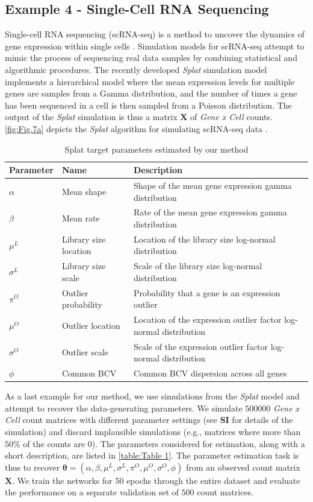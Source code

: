 \documentclass[9pt,twoside,lineno]{pnas-new}
\begin{document}
\subsection*{Example 4 - Single-Cell RNA Sequencing}
Single-cell RNA sequencing (scRNA-seq) is a method to uncover the dynamics of gene expression within single cells \cite{zappia2017splatter, ozsolak2011rna}. Simulation models for scRNA-seq attempt to mimic the process of sequencing real data samples by combining statistical and algorithmic procedures. The recently developed \textit{Splat} simulation model \cite{zappia2017splatter} implements a hierarchical model where the mean expression levels for multiple genes are samples from a Gamma distribution, and the number of times a gene has been sequenced in a cell is then sampled from a Poisson distribution. The output of the \textit{Splat} simulation is thus a matrix $\boldsymbol{X}$ of \textit{Gene x Cell} counts. \autoref{fig:Fig.7a} depicts the \textit{Splat} algorithm for simulating scRNA-seq data \cite{zappia2017splatter}.
\begin{table} 
\centering
\caption{Splat target parameters estimated by our method}
\begin{tabular}{lll}
Parameter & Name & Description\\
\midrule
$\alpha$ & Mean shape & Shape of the mean gene expression gamma distribution \\
$\beta$ & Mean rate & Rate of the mean gene expression gamma distribution \\
$\mu^{L}$ & Library size location & Location of the library size log-normal distribution \\
$\sigma^{L}$ & Library size scale & Scale of the library size log-normal distribution \\
$\pi^{O}$ & Outlier probability & Probability that a gene is an expression outlier \\
$\mu^{O}$ & Outlier location & Location of the expression outlier factor log-normal distribution \\
$\sigma^{O}$ & Outlier scale & Scale of the expression outlier factor log-normal distribution \\
$\phi$ & Common BCV & Common BCV dispersion across all genes \\
\bottomrule
\end{tabular}
\label{table:Table 1}
\end{table}
As a last example for our method, we use simulations from the \textit{Splat} model and attempt to recover the data-generating parameters. We simulate $500000$  \textit{Gene x Cell} count matrices with different parameter settings (see \textbf{SI} for details of the simulation) and discard implausible simulations (e.g., matrices where more than $50\%$ of the counts are $0$). The parameters considered for estimation, along with a short description, are listed in \autoref{table:Table 1}. The parameter estimation task is thus to recover $\boldsymbol{\theta} = (\alpha,\beta,\mu^{L},\sigma^{L},\pi^{O},\mu^{O},\sigma^{O},\phi)$ from an observed count matrix $\boldsymbol{X}$. We train the networks for 50 epochs through the entire dataset and evaluate the performance on a separate validation set of $500$ count matrices.
\end{document}
